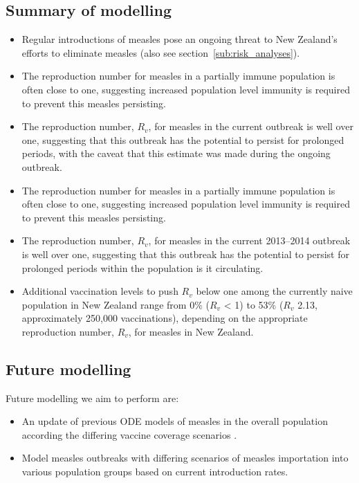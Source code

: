\documentclass{article}
\begin{document}
\subsection{Summary of modelling}
\begin{itemize}
\item Regular introductions of measles pose an ongoing threat to New Zealand's efforts to eliminate measles (also see section~\ref{sub:risk_analyses}).
\item The reproduction number for measles in a partially immune population is often close to one, suggesting increased population level immunity is required to prevent this measles persisting.
 \item The reproduction number, $R_v$, for measles in the current outbreak is well over one, suggesting that this outbreak has the potential to persist for prolonged periods, with the caveat that this estimate was made during the ongoing outbreak.
\item The reproduction number for measles in a partially immune population is often close to one, suggesting increased population level immunity is required to prevent this measles persisting.
 \item The reproduction number, $R_v$, for measles in the current 2013--2014 outbreak is well over one, suggesting that this outbreak has the potential to persist for prolonged periods within the population is it circulating.
 \item Additional vaccination levels to push $R_v$ below one among the currently naive population in New Zealand range from 0\% ($R_v$ < 1) to 53\% ($R_v$ 2.13, approximately 250,000 vaccinations), depending on the appropriate reproduction number, $R_v$, for measles in New Zealand.
\end{itemize}

\subsection{Future modelling}
Future modelling we aim to perform are:
\begin{itemize}
\item An update of previous ODE models of measles in the overall population according the differing vaccine coverage scenarios \citep{roberts4}.
\item Model measles outbreaks with differing scenarios of measles importation into various population groups based on current introduction rates.
\end{itemize}
\end{document}
